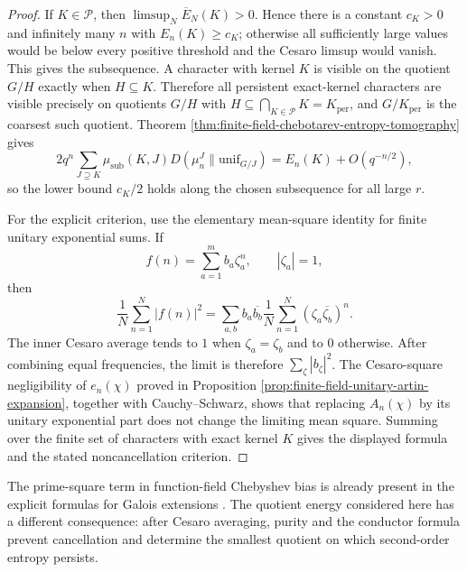 \begin{proof}
If \(K\in\mathcal P\), then \(\limsup_N\overline E_N(K)>0\). Hence there is a constant \(c_K>0\) and infinitely many \(n\) with \(E_n(K)\ge c_K\); otherwise all sufficiently large values would be below every positive threshold and the Cesaro limsup would vanish. This gives the subsequence. A character with kernel \(K\) is visible on the quotient \(G/H\) exactly when \(H\subseteq K\). Therefore all persistent exact-kernel characters are visible precisely on quotients \(G/H\) with \(H\subseteq\bigcap_{K\in\mathcal P}K=K_{\mathrm{per}}\), and \(G/K_{\mathrm{per}}\) is the coarsest such quotient. Theorem \ref{thm:finite-field-chebotarev-entropy-tomography} gives
\[
2q^n\sum_{J\supseteq K}\mu_{\mathrm{sub}}(K,J)
D(\mu_n^J\|\mathrm{unif}_{G/J})
=E_n(K)+O(q^{-n/2}),
\]
so the lower bound \(c_K/2\) holds along the chosen subsequence for all large \(r\).

For the explicit criterion, use the elementary mean-square identity for finite unitary exponential sums. If
\[
f(n)=\sum_{a=1}^m b_a\zeta_a^n,
\qquad |\zeta_a|=1,
\]
then
\[
\frac1N\sum_{n=1}^N |f(n)|^2
=\sum_{a,b}b_a\overline{b_b}\frac1N\sum_{n=1}^N(\zeta_a\overline{\zeta_b})^n.
\]
The inner Cesaro average tends to \(1\) when \(\zeta_a=\zeta_b\) and to \(0\) otherwise. After combining equal frequencies, the limit is therefore \(\sum_\zeta |b_\zeta|^2\). The Cesaro-square negligibility of \(e_n(\chi)\) proved in Proposition \ref{prop:finite-field-unitary-artin-expansion}, together with Cauchy--Schwarz, shows that replacing \(A_n(\chi)\) by its unitary exponential part does not change the limiting mean square. Summing over the finite set of characters with exact kernel \(K\) gives the displayed formula and the stated noncancellation criterion.
\end{proof}

The prime-square term in function-field Chebyshev bias is already present in
the explicit formulas for Galois extensions \cite{ChaIm2011}.  The quotient
energy considered here has a different consequence: after Cesaro averaging,
purity and the conductor formula prevent cancellation and determine the
smallest quotient on which second-order entropy persists.

